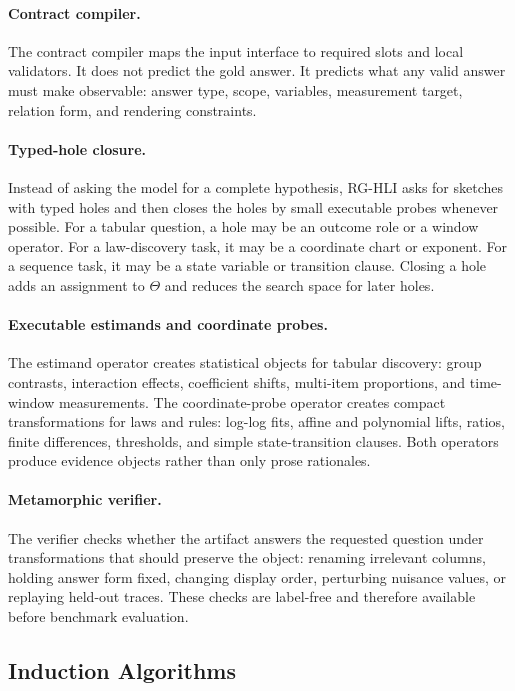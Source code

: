 \documentclass[letterpaper]{article}
\newcommand{\methodshort}{\textsc{RG-HLI}\xspace}
\begin{document}
\paragraph{Contract compiler.}
The contract compiler maps the input interface to required slots and local
validators. It does not predict the gold answer. It predicts what any valid
answer must make observable: answer type, scope, variables, measurement target,
relation form, and rendering constraints.

\paragraph{Typed-hole closure.}
Instead of asking the model for a complete hypothesis, \methodshort asks for sketches
with typed holes and then closes the holes by small executable probes whenever
possible. For a tabular question, a hole may be an outcome role or a window
operator. For a law-discovery task, it may be a coordinate chart or exponent.
For a sequence task, it may be a state variable or transition clause. Closing a
hole adds an assignment to $\Theta$ and reduces the search space for later
holes.

\paragraph{Executable estimands and coordinate probes.}
The estimand operator creates statistical objects for tabular discovery:
group contrasts, interaction effects, coefficient shifts, multi-item
proportions, and time-window measurements. The coordinate-probe operator
creates compact transformations for laws and rules: log-log fits, affine and
polynomial lifts, ratios, finite differences, thresholds, and simple
state-transition clauses. Both operators produce evidence objects rather than
only prose rationales.

\paragraph{Metamorphic verifier.}
The verifier checks whether the artifact answers the requested question under
transformations that should preserve the object: renaming irrelevant columns,
holding answer form fixed, changing display order, perturbing nuisance values,
or replaying held-out traces. These checks are label-free and therefore
available before benchmark evaluation.

\subsection{Induction Algorithms}
\end{document}

